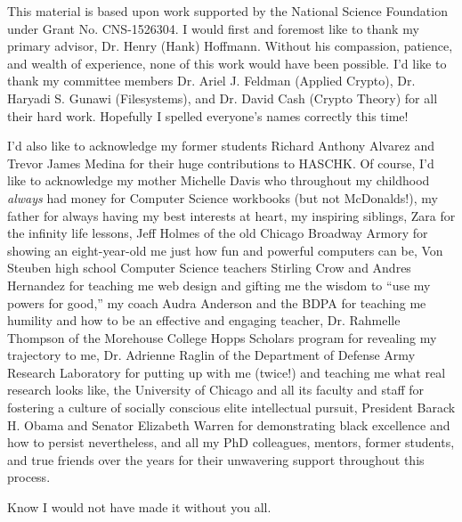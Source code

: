 \acknowledgments
This material is based upon work supported by the National Science Foundation
under Grant No. CNS-1526304. I would first and foremost like to thank my primary
advisor, Dr. Henry (Hank) Hoffmann. Without his compassion, patience, and wealth
of experience, none of this work would have been possible. I'd like to thank my
committee members Dr. Ariel J. Feldman (Applied Crypto), Dr. Haryadi S. Gunawi
(Filesystems), and Dr. David Cash (Crypto Theory) for all their hard work.
Hopefully I spelled everyone's names correctly this time!

I'd also like to acknowledge my former students Richard Anthony Alvarez and
Trevor James Medina for their huge contributions to HASCHK. Of course, I'd like
to acknowledge my mother Michelle Davis who throughout my childhood
\emph{always} had money for Computer Science workbooks (but not McDonalds!), my
father for always having my best interests at heart, my inspiring siblings, Zara
for the infinity life lessons, Jeff Holmes of the old Chicago Broadway Armory
for showing an eight-year-old me just how fun and powerful computers can be, Von
Steuben high school Computer Science teachers Stirling Crow and Andres Hernandez
for teaching me web design and gifting me the wisdom to ``use my powers for
good,'' my coach Audra Anderson and the BDPA for teaching me humility and how to
be an effective and engaging teacher, Dr. Rahmelle Thompson of the Morehouse
College Hopps Scholars program for revealing my trajectory to me, Dr. Adrienne
Raglin of the Department of Defense Army Research Laboratory for putting up with
me (twice!) and teaching me what real research looks like, the University of
Chicago and all its faculty and staff for fostering a culture of socially
conscious elite intellectual pursuit, President Barack H. Obama and Senator
Elizabeth Warren for demonstrating black excellence and how to persist
nevertheless, and all my PhD colleagues, mentors, former students, and true
friends over the years for their unwavering support throughout this process.

Know I would not have made it without you all.
